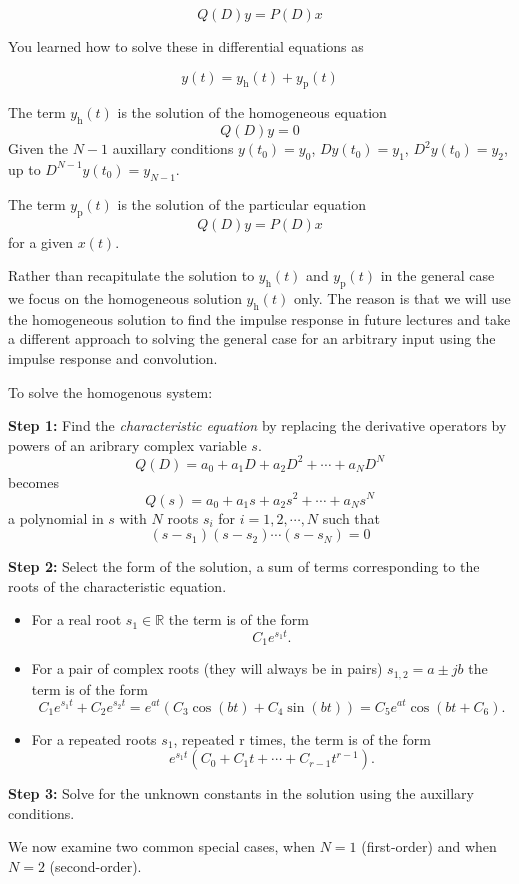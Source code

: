 \[
Q(D)y = P(D)x
\]

You learned how to solve these in differential equations as

\[
y(t) = y_\text{h}(t) + y_\text{p}(t)
\]

The term $y_\text{h}(t)$ is the solution of the homogeneous equation
\[
Q(D)y = 0
\]
Given the $N-1$ auxillary conditions $y(t_0) = y_0$, $Dy(t_0) = y_1$, $D^2y(t_0) = y_2$, up to $D^{N-1}y(t_0) = y_{N-1}$.

The term $y_\text{p}(t)$ is the solution of the particular equation
\[
Q(D)y = P(D)x
\]
for a given $x(t)$.

Rather than recapitulate the solution to $y_\text{h}(t)$ and $y_\text{p}(t)$ in the general case we focus on the homogeneous solution $y_\text{h}(t)$ only. The reason is that we will use the homogeneous solution to find the impulse response in future lectures and take a different approach to solving the general case for an arbitrary input using the impulse response and convolution.

To solve the homogenous system:

\textbf{Step 1:} Find the \emph{characteristic equation} by replacing the derivative operators by powers of an aribrary complex variable $s$.
\[
Q(D) = a_0 + a_1D + a_2D^2 + \cdots + a_ND^N
\]
becomes
\[
Q(s) = a_0 + a_1s + a_2s^2 + \cdots + a_Ns^N
\]
a polynomial in $s$ with $N$ roots $s_i$ for $i = 1, 2, \cdots, N$ such that
\[
(s - s_1)(s-s_2)\cdots(s-s_N) = 0
\]

\textbf{Step 2:} Select the form of the solution, a sum of terms corresponding to the roots of the characteristic equation.

\begin{itemize}
\item For a real root $s_1\in \mathbb{R}$ the term is of the form
  \[
  C_1 e^{s_1 t}.
  \]
\item For a pair of complex roots (they will always be in pairs) $s_{1,2} = a \pm jb$ the term is of the form
  \[
  C_1 e^{s_1 t} + C_2 e^{s_2 t} = e^{a t}\left(C_3\cos(bt) + C_4\sin(bt)\right) = C_5 e^{a t}\cos(bt + C_6).
  \]
\item For a repeated roots $s_1$, repeated r times, the term is of the form
  \[
  e^{s_1 t} (C_0 + C_1 t + \cdots + C_{r-1} t^{r-1}).\]
\end{itemize}

\textbf{Step 3:} Solve for the unknown constants in the solution using the auxillary conditions. 

We now examine two common special cases, when $N=1$ (first-order) and when $N=2$ (second-order).

